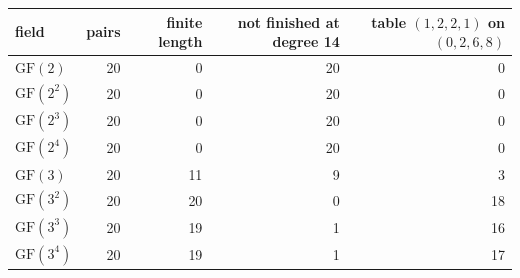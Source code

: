 \begin{tabular}{@{}lrrrr@{}}
\toprule
field & pairs & finite length & not finished at degree 14 & table $(1,2,2,1)$ on $(0,2,6,8)$\\
\midrule
$\mathrm{GF}(2)$ & 20 & 0 & 20 & 0\\
$\mathrm{GF}(2^{2})$ & 20 & 0 & 20 & 0\\
$\mathrm{GF}(2^{3})$ & 20 & 0 & 20 & 0\\
$\mathrm{GF}(2^{4})$ & 20 & 0 & 20 & 0\\
$\mathrm{GF}(3)$ & 20 & 11 & 9 & 3\\
$\mathrm{GF}(3^{2})$ & 20 & 20 & 0 & 18\\
$\mathrm{GF}(3^{3})$ & 20 & 19 & 1 & 16\\
$\mathrm{GF}(3^{4})$ & 20 & 19 & 1 & 17\\
\bottomrule
\end{tabular}
